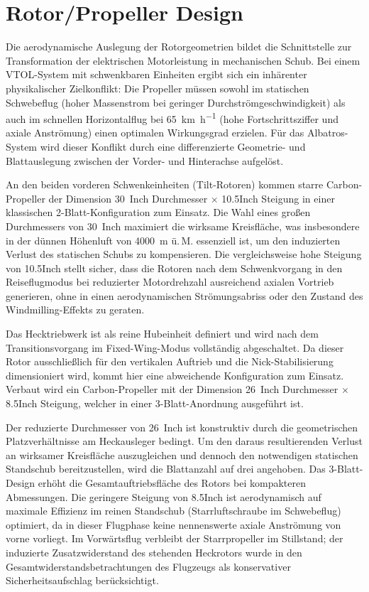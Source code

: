 \section{Rotor/Propeller Design}

\noindent
Die aerodynamische Auslegung der Rotorgeometrien bildet die Schnittstelle zur Transformation der elektrischen Motorleistung in mechanischen Schub. Bei einem VTOL-System mit schwenkbaren Einheiten ergibt sich ein inhärenter physikalischer Zielkonflikt: Die Propeller müssen sowohl im statischen Schwebeflug (hoher Massenstrom bei geringer Durchströmgeschwindigkeit) als auch im schnellen Horizontalflug bei \SI{65}{\kilo\meter\per\hour} (hohe Fortschrittsziffer und axiale Anströmung) einen optimalen Wirkungsgrad erzielen. Für das Albatros-System wird dieser Konflikt durch eine differenzierte Geometrie- und Blattauslegung zwischen der Vorder- und Hinterachse aufgelöst.

\noindent
An den beiden vorderen Schwenkeinheiten (Tilt-Rotoren) kommen starre Carbon-Propeller der Dimension \SI{30}{Inch} Durchmesser $\times$ \num{10.5}{Inch} Steigung in einer klassischen 2-Blatt-Konfiguration zum Einsatz. Die Wahl eines großen Durchmessers von \SI{30}{Inch} maximiert die wirksame Kreisfläche, was insbesondere in der dünnen Höhenluft von \SI{4000}{\meter} ü.\,M. essenziell ist, um den induzierten Verlust des statischen Schubs zu kompensieren. Die vergleichsweise hohe Steigung von \num{10.5}{Inch} stellt sicher, dass die Rotoren nach dem Schwenkvorgang in den Reiseflugmodus bei reduzierter Motordrehzahl ausreichend axialen Vortrieb generieren, ohne in einen aerodynamischen Strömungsabriss oder den Zustand des Windmilling-Effekts zu geraten.

\noindent
Das Hecktriebwerk ist als reine Hubeinheit definiert und wird nach dem Transitionsvorgang im Fixed-Wing-Modus vollständig abgeschaltet. Da dieser Rotor ausschließlich für den vertikalen Auftrieb und die Nick-Stabilisierung dimensioniert wird, kommt hier eine abweichende Konfiguration zum Einsatz. Verbaut wird ein Carbon-Propeller mit der Dimension \SI{26}{Inch} Durchmesser $\times$ \num{8.5}{Inch} Steigung, welcher in einer 3-Blatt-Anordnung ausgeführt ist. 

\noindent
Der reduzierte Durchmesser von \SI{26}{Inch} ist konstruktiv durch die geometrischen Platzverhältnisse am Heckausleger bedingt. Um den daraus resultierenden Verlust an wirksamer Kreisfläche auszugleichen und dennoch den notwendigen statischen Standschub bereitzustellen, wird die Blattanzahl auf drei angehoben. Das 3-Blatt-Design erhöht die Gesamtauftriebsfläche des Rotors bei kompakteren Abmessungen. Die geringere Steigung von \num{8.5}{Inch} ist aerodynamisch auf maximale Effizienz im reinen Standschub (Starrluftschraube im Schwebeflug) optimiert, da in dieser Flugphase keine nennenswerte axiale Anströmung von vorne vorliegt. Im Vorwärtsflug verbleibt der Starrpropeller im Stillstand; der induzierte Zusatzwiderstand des stehenden Heckrotors wurde in den Gesamtwiderstandsbetrachtungen des Flugzeugs als konservativer Sicherheitsaufschlag berücksichtigt.